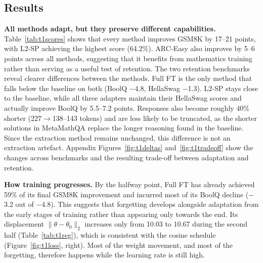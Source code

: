 \documentclass{article}
\begin{document}
\subsection{Results}

\textbf{All methods adapt, but they preserve different capabilities.} Table~\ref{tab:t1scores} shows that every method improves GSM8K by 17--21 points, with L2-SP achieving the highest score (64.2\%). ARC-Easy also improves by 5--6 points across all methods, suggesting that it benefits from mathematics training rather than serving as a useful test of retention. The two retention benchmarks reveal clearer differences between the methods. Full FT is the only method that falls below the baseline on both (BoolQ $-$4.8, HellaSwag $-$1.3). L2-SP stays close to the baseline, while all three adapters maintain their HellaSwag scores and actually improve BoolQ by 5.5--7.2 points. Responses also become roughly 40\% shorter (227$\to$138--143 tokens) and are less likely to be truncated, as the shorter solutions in MetaMathQA replace the longer reasoning found in the baseline. Since the extraction method remains unchanged, this difference is not an extraction artefact. Appendix Figures~\ref{fig:t1deltas} and~\ref{fig:t1tradeoff} show the changes across benchmarks and the resulting trade-off between adaptation and retention.

\textbf{How training progresses.} By the halfway point, Full FT has already achieved 59\% of its final GSM8K improvement and incurred most of its BoolQ decline ($-$3.2 out of $-$4.8). This suggests that forgetting develops alongside adaptation from the early stages of training rather than appearing only towards the end. Its displacement $\|\theta-\theta_0\|_2$ increases only from 10.03 to 10.67 during the second half (Table~\ref{tab:t1reg}), which is consistent with the cosine schedule (Figure~\ref{fig:t1loss}, right). Most of the weight movement, and most of the forgetting, therefore happens while the learning rate is still high.
\end{document}
